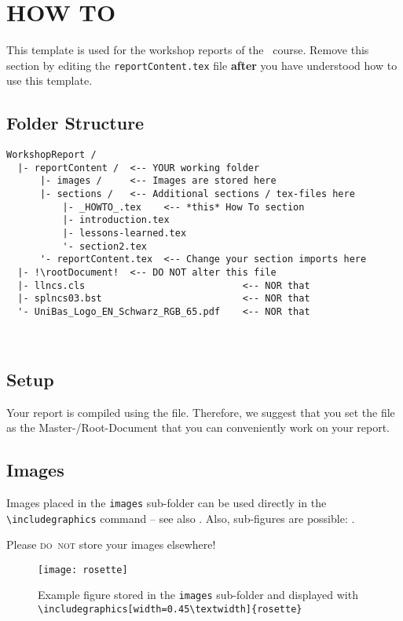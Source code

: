 \section*{HOW TO}
This template is used for the workshop reports of the \coursename\ course. Remove this section by editing the \texttt{reportContent.tex} file \textbf{after} you have understood how to use this template.

\subsection*{Folder Structure}
\begin{lstlisting}[escapechar=!]
WorkshopReport /
  |- reportContent /  <-- YOUR working folder
      |- images /     <-- Images are stored here
      |- sections /   <-- Additional sections / tex-files here
          |- _HOWTO_.tex    <-- *this* How To section
          |- introduction.tex
          |- lessons-learned.tex
          '- section2.tex
      '- reportContent.tex  <-- Change your section imports here
  |- !\rootDocument!  <-- DO NOT alter this file
  |- llncs.cls                            <-- NOR that
  |- splncs03.bst                         <-- NOR that
  '- UniBas_Logo_EN_Schwarz_RGB_65.pdf    <-- NOR that
\end{lstlisting}
\ 

\subsection*{Setup}
Your report is compiled using the \texttt{\rootDocument} file. Therefore, we suggest that you set the file \texttt{\rootDocument} as the Master-/Root-Document that you can conveniently work on your report. 


\subsection*{Images}
Images placed in the \texttt{images} sub-folder can be used directly in the \texttt{\textbackslash includegraphics} command -- see also . Also, sub-figures are possible: .

Please \textsc{do~not} store your images elsewhere! 

\begin{figure}[tb]
\centering
\texttt{[image: rosette]}
\caption{Example figure stored in the \texttt{images} sub-folder and displayed with \texttt{\textbackslash includegraphics[width=0.45\textbackslash textwidth]\{rosette\}}}
\label{fig:rosette}
\end{figure}

